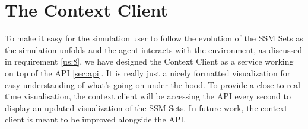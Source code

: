 \section{The Context Client} %
\label{sec:context_client}
To make it easy for the simulation user to follow the evolution of the SSM Sets as the simulation unfolds and the agent interacts with the environment, as discussed in requirement \ref{us:8}, we have designed the Context Client as a service working on top of the API \ref{sec:api}. It is really just a nicely formatted visualization for easy understanding of what's going on under the hood. To provide a close to real-time visualisation, the context client will be accessing the API every second to display an updated visualization of the SSM Sets. In future work, the context client is meant to be improved alongside the API.\\
